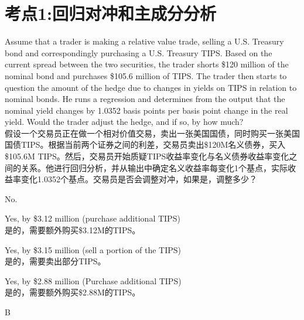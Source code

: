 \documentclass{article}
\newcounter{question} %
\begin{document}
 \tableofcontents %
\newpage




\section{考点1:回归对冲和主成分分析}
\setcounter{question}{0}



\begin{question}
    Assume that a trader is making a relative value trade, selling a U.S. Treasury bond and
    correspondingly purchasing a U.S. Treasury TIPS. Based on the current spread between the two
    securities, the trader shorts \$120 million of the nominal bond and purchases \$105.6 million of
    TIPS. The trader then starts to question the amount of the hedge due to changes in yields on
    TIPS in relation to nominal bonds. He runs a regression and determines from the output that the
    nominal yield changes by 1.0352 basis points per basis point change in the real yield. Would
    the trader adjust the hedge, and if so, by how much?
    \\假设一个交易员正在做一个相对价值交易，卖出一张美国国债，同时购买一张美国国债TIPS。根据当前两个证券之间的利差，交易员卖出\$120M名义债券，买入\$105.6M TIPS。然后，交易员开始质疑TIPS收益率变化与名义债券收益率变化之间的关系。他进行回归分析，并从输出中确定名义收益率每变化1个基点，实际收益率变化1.0352个基点。交易员是否会调整对冲，如果是，调整多少？
\end{question}

\begin{choices}
    \item No.
    \item Yes, by \$3.12 million (purchase additional TIPS)\\
        是的，需要额外购买\$3.12M的TIPS。
    \item Yes, by \$3.15 million (sell a portion of the TIPS)\\
        是的，需要卖出部分TIPS。
    \item Yes, by \$2.88 million (Purchase additional TIPS)\\
        是的，需要额外购买\$2.88M的TIPS。
\end{choices}

\begin{correctanswer}
    B
\end{correctanswer}
\end{document}
